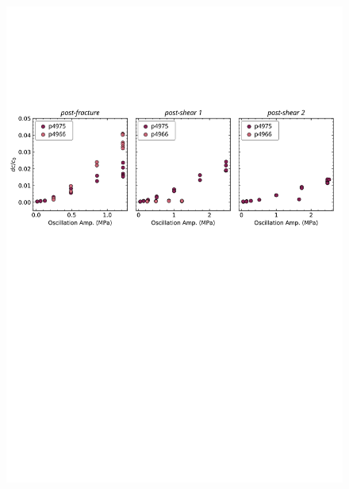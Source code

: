 \documentclass[letterpaper,10pt]{article}
\begin{document}
\begin{figure}[ht]
	\centering
	\includegraphics[width=1\columnwidth]{Dc_NS_amp}

\end{figure}
\end{document}
